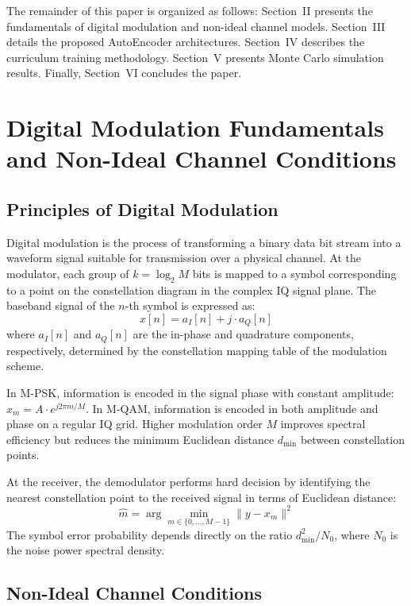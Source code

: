 \documentclass{JECnew}
\begin{document}
{\color{blue}The remainder of this paper is organized as follows: Section~II presents the fundamentals of digital modulation and non-ideal channel models. Section~III details the proposed AutoEncoder architectures. Section~IV describes the curriculum training methodology. Section~V presents Monte Carlo simulation results. Finally, Section~VI concludes the paper.}

\section{Digital Modulation Fundamentals and Non-Ideal Channel Conditions}

\subsection{Principles of Digital Modulation}

Digital modulation is the process of transforming a binary data bit stream into a waveform signal suitable for transmission over a physical channel. At the modulator, each group of $k = \log_2 M$ bits is mapped to a symbol corresponding to a point on the constellation diagram in the complex IQ signal plane. The baseband signal of the $n$-th symbol is expressed as:
\begin{equation}
x[n] = a_I[n] + j \cdot a_Q[n]
\end{equation}
where $a_I[n]$ and $a_Q[n]$ are the in-phase and quadrature components, respectively, determined by the constellation mapping table of the modulation scheme.

In M-PSK, information is encoded in the signal phase with constant amplitude: $x_m = A \cdot e^{j2\pi m/M}$. In M-QAM, information is encoded in both amplitude and phase on a regular IQ grid. Higher modulation order $M$ improves spectral efficiency but reduces the minimum Euclidean distance $d_{\min}$ between constellation points.

At the receiver, the demodulator performs hard decision by identifying the nearest constellation point to the received signal in terms of Euclidean distance:
\begin{equation}
\hat{m} = \arg\min_{m \in \{0,\ldots,M-1\}} \| y - x_m \|^2
\end{equation}
The symbol error probability depends directly on the ratio $d_{\min}^2 / N_0$, where $N_0$ is the noise power spectral density.

\subsection{Non-Ideal Channel Conditions}
\end{document}
